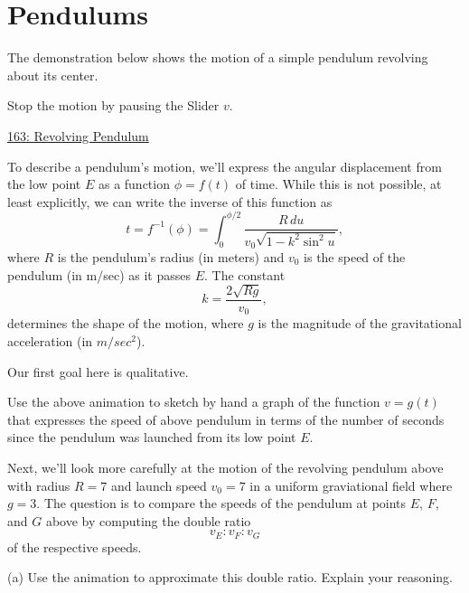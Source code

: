 \documentclass{ximera}
\begin{document}
\section*{Pendulums}

\begin{question}  \label{QDfdfgrenhht44}
The demonstration below shows the motion of a simple pendulum revolving about its center.

Stop the motion by pausing the Slider $v$. 
\begin{onlineOnly}
    \begin{center}
\end{center}
\end{onlineOnly}

\href{https://www.desmos.com/calculator/nsfqtjr8fd}{163: Revolving Pendulum}

To describe a pendulum's motion, we'll express the angular displacement from the low point $E$ as a function $\phi = f(t)$ of time. While this is not possible, at least explicitly, we can write the inverse of this function as
\[
     t = f^{-1}(\phi) = \int_0^{\phi/2} \frac{R\, du}{v_0\sqrt{1-k^2\sin^2u}} ,
\]
where $R$ is the pendulum's radius (in meters) and $v_0$ is the speed of the pendulum (in m/sec) as it passes $E$. The constant 
\[
        k = \frac{2\sqrt{Rg}}{v_0} ,
\]
determines the shape of the motion, where $g$ is the magnitude of the gravitational acceleration (in $m/sec^2$).

Our first goal here is qualitative. 
\begin{freeResponse}
Use the above animation to sketch by hand a graph of the function $v=g(t)$ that expresses the speed of above pendulum in terms of the number of seconds since the pendulum was launched from its low point $E$.
\end{freeResponse}


Next, we'll look more carefully at the motion of the revolving pendulum above with radius $R=7$ and launch speed $v_0=7$ in a uniform graviational field where $g=3$. The question is to compare the speeds of the pendulum at points $E$, $F$, and $G$ above by computing the double ratio
\[
  v_E : v_F : v_G
\]
of the respective speeds.

\begin{freeResponse}
(a) Use the animation to approximate this double ratio. Explain your reasoning.
\end{freeResponse}



\end{question}
\end{document}
